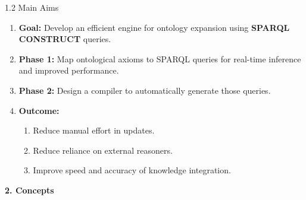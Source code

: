 \begin{frame}{1.2 Main Aims}
    \begin{bee}
        \begin{enumerate}[$\bullet$]
        \item \textbf{Goal:} Develop an efficient engine for ontology expansion using \textbf{SPARQL CONSTRUCT} queries.
        \item \textbf{Phase 1:} Map ontological axioms to SPARQL queries for real-time inference and improved performance.
        \item \textbf{Phase 2:} Design a compiler to automatically generate those queries.
        \item \textbf{Outcome:}  
        \begin{enumerate}[$\bullet$]  
            \item Reduce manual effort in updates.  
            \item Reduce reliance on external reasoners.
            \item Improve speed and accuracy of knowledge integration.  
        \end{enumerate}
    \end{enumerate}
    \end{bee}
\end{frame}

\begin{frame}[plain]
    \begingroup
        \selectfont
        \Huge\color{black}\textbf{2. Concepts}\\[0.6em]
    \endgroup
\end{frame}

